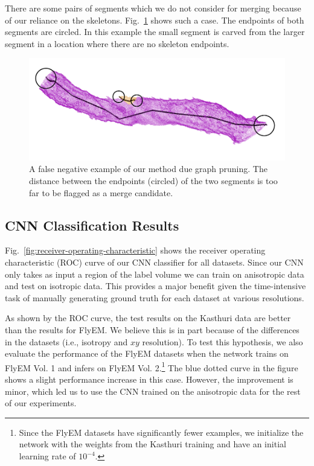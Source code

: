 There are some pairs of segments which we do not consider for merging because of our reliance on the skeletons. 
Fig.~\ref{fig:skeleton-results} shows such a case. 
The endpoints of both segments are circled.
In this example the small segment is carved from the larger segment in a location where there are no skeleton endpoints.

\begin{figure}[h!]
	\centering
	\includegraphics[width=0.85\linewidth]{./figures/merge_candidate1.png}
	\caption{A false negative example of our method due graph pruning. The distance between the endpoints (circled) of the two segments is too far to be flagged as a merge candidate.}
	\label{fig:skeleton-results}
\end{figure}


\subsection{CNN Classification Results}

Fig.~\ref{fig:receiver-operating-characteristic} shows the receiver operating characteristic (ROC) curve of our CNN classifier for all datasets.
Since our CNN only takes as input a region of the label volume we can train on  anisotropic data and test on isotropic data.
This provides a major benefit given the time-intensive task of manually generating ground truth for each dataset at various resolutions.

As shown by the ROC curve, the test results on the Kasthuri data are better than the results for FlyEM.
We believe this is in part because of the differences in the datasets (i.e., isotropy and $xy$ resolution).
To test this hypothesis, we also evaluate the performance of the FlyEM datasets when the network trains on FlyEM Vol. 1 and infers on FlyEM Vol. 2.\footnote{Since the FlyEM datasets have significantly fewer examples, we initialize the network with the weights from the Kasthuri training and have an initial learning rate of $10^{-4}$.}
The blue dotted curve in the figure shows a slight performance increase in this case. However, the improvement is minor, which led us to use the CNN trained on the anisotropic data for the rest of our experiments.

